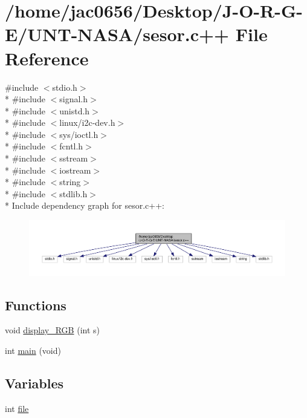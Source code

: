 \hypertarget{sesor_8c_09_09}{}\section{/home/jac0656/\+Desktop/\+J-\/\+O-\/\+R-\/\+G-\/\+E/\+U\+N\+T-\/\+N\+A\+S\+A/sesor.c++ File Reference}
\label{sesor_8c_09_09}
{\ttfamily \#include $<$stdio.\+h$>$}\\*
{\ttfamily \#include $<$signal.\+h$>$}\\*
{\ttfamily \#include $<$unistd.\+h$>$}\\*
{\ttfamily \#include $<$linux/i2c-\/dev.\+h$>$}\\*
{\ttfamily \#include $<$sys/ioctl.\+h$>$}\\*
{\ttfamily \#include $<$fcntl.\+h$>$}\\*
{\ttfamily \#include $<$sstream$>$}\\*
{\ttfamily \#include $<$iostream$>$}\\*
{\ttfamily \#include $<$string$>$}\\*
{\ttfamily \#include $<$stdlib.\+h$>$}\\*
Include dependency graph for sesor.\+c++\+:\nopagebreak
\begin{figure}[H]
\begin{center}
\leavevmode
\includegraphics[width=350pt]{sesor_8c_09_09__incl}
\end{center}
\end{figure}
\subsection*{Functions}
\begin{DoxyCompactItemize}
\item 
void \hyperlink{sesor_8c_09_09_af6d9d492718e5b567f2de33317908a60}{display\+\_\+\+R\+GB} (int s)
\item 
int \hyperlink{sesor_8c_09_09_a840291bc02cba5474a4cb46a9b9566fe}{main} (void)
\end{DoxyCompactItemize}
\subsection*{Variables}
\begin{DoxyCompactItemize}
\item 
int \hyperlink{sesor_8c_09_09_a6fb021f1c9bd6c7fc72f1c0f24b81b38}{file}
\end{DoxyCompactItemize}


